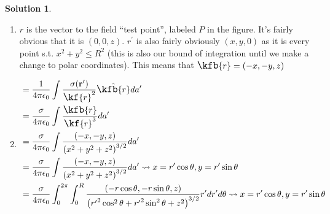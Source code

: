 \documentclass[10pt]{article}
\theoremstyle{definition}
\newtheorem{soln}{Solution}
\newcommand{\primed}[1]{#1^\prime}
\newcommand{\scriptr}{\fontsize{12pt}{12pt}\kf{r}}
\newcommand{\bscriptr}{\fontsize{12pt}{12pt}\kfb{r}}
\begin{document}
\begin{soln}
\begin{enumerate}[label=(\alph*)]
\begin{center}
          \end{center}
    \item $r$ is the vector to the field ``test point'', labeled $P$ in the figure. It's fairly obvious that it is $(0,0,z)$.
          $\primed{r}$ is also fairly obviously $(x,y,0)$ as it is every point s.t. $x^2+y^2\leq R^2$ (this is also our bound of integration until we make a change to polar coordinates).
          This means that $\bscriptr=(-x,-y,z)$
    \item \begin{align*}
             & = \frac{1}{4\pi\epsilon_0}\int\frac{\sigma(\mathbf{\primed{r}})}{\scriptr^2}\hat{\bscriptr}d\primed{a}                                                                                                                               \\
             & = \frac{\sigma}{4\pi\epsilon_0}\int\frac{\bscriptr}{\scriptr^3}d\primed{a}                                                                                                                                                           \\
             & = \frac{\sigma}{4\pi\epsilon_0}\int\frac{(-x,-y,z)}{\left(x^2+y^2+z^2\right)^{3/2}}d\primed{a}                                                                                                                                       \\
             & = \frac{\sigma}{4\pi\epsilon_0}\int\frac{(-x,-y,z)}{\left(x^2+y^2+z^2\right)^{3/2}}d\primed{a} \rightsquigarrow x=\primed{r}\cos\theta,y=\primed{r}\sin\theta                                                                        \\
             & = \frac{\sigma}{4\pi\epsilon_0}\int_0^{2\pi}\int_0^R\frac{(-r\cos\theta,-r\sin\theta,z)}{\left({\primed{r}}^2\cos^2\theta+{\primed{r}}^2\sin^2\theta+z^2\right)^{3/2}}\primed{r}d\primed{r}d\theta
            \rightsquigarrow x=\primed{r}\cos\theta,y=\primed{r}\sin\theta                                                                                                                                                                          \\

\end{align*}
\end{enumerate}
\end{soln}
\end{document}
